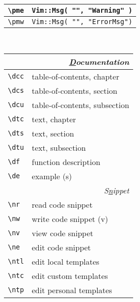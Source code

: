 \documentclass[oneside,10pt,landscape,DIV16]{scrartcl}
\begin{document}
\begin{multicols}{3}
\begin{center}
\begin{tabular}[]{|p{11mm}|p{58mm}|}
\hline \verb'\pme'  & \texttt{Vim::Msg( "", "Warning" )} \\
\hline \verb'\pmw'  & \texttt{Vim::Msg( "", "ErrorMsg")} \\
\hline
\end{tabular}\\
%
%
\begin{tabular}[]{|p{11mm}|p{58mm}|}
\hline
\multicolumn{2}{|r|}{\textsl{\underline{D}ocumentation}}                 \\[1.0ex]
\hline \verb'\dcc' & table-of-contents, chapter    \\
\hline \verb'\dcs' & table-of-contents, section    \\
\hline \verb'\dcu' & table-of-contents, subsection \\
\hline \verb'\dtc' & text, chapter                 \\
\hline \verb'\dts' & text, section                 \\
\hline \verb'\dtu' & text, subsection              \\
\hline \verb'\df'  & function description          \\
\hline \verb'\de'  & example                       \hfill (s)\\
\hline
\hline
\multicolumn{2}{|r|}{\textsl{S\underline{n}ippet}}                \\[1.0ex]
\hline \verb'\nr'  & read code snippet         \\
\hline \verb'\nw'  & write code snippet        \hfill (v)\\
\hline \verb'\nv'  & view code snippet         \\
\hline \verb'\ne'  & edit code snippet         \\
%
\hline \verb'\ntl' & edit local templates      \\
\hline \verb'\ntc' & edit custom templates     \\
\hline \verb'\ntp' & edit personal templates   \\

\end{tabular}
\end{center}
\end{multicols}
\end{document}
